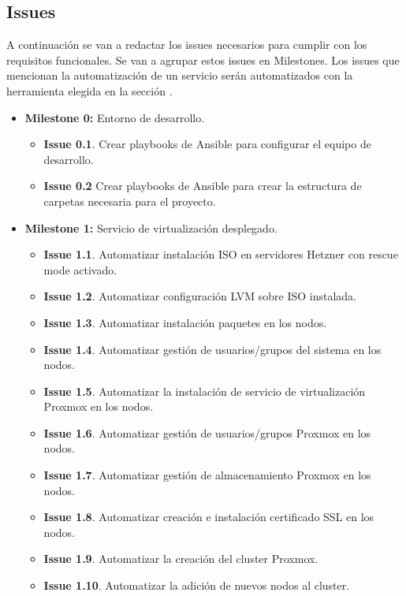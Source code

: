 \subsection{Issues}
\label{issues}
\begin{text}
	A continuación se van a redactar los issues necesarios para cumplir con los requisitos funcionales. Se van a agrupar estos issues en Milestones. Los issues que mencionan la automatización de un servicio serán automatizados con la herramienta elegida en la sección .
	
	\begin{itemize}
		\item \textbf{Milestone 0:} Entorno de desarrollo. 
		\begin{itemize}
			\item \textbf{Issue 0.1}. Crear playbooks de Ansible para configurar el equipo de desarrollo.
			\item \textbf{Issue 0.2} Crear playbooks de Ansible para crear la estructura de carpetas necesaria para el proyecto.
		\end{itemize}
		\item \textbf{Milestone 1:} Servicio de virtualización desplegado. 
		\begin{itemize}
			\item \textbf{Issue 1.1}. Automatizar instalación ISO en servidores Hetzner con rescue mode activado.
			\item \textbf{Issue 1.2}. Automatizar configuración LVM sobre ISO instalada.
			\item \textbf{Issue 1.3}. Automatizar instalación paquetes en los nodos.
			\item \textbf{Issue 1.4}. Automatizar gestión de usuarios/grupos del sistema en los nodos.
			\item \textbf{Issue 1.5}. Automatizar la instalación de servicio de virtualización Proxmox en los nodos.
			\item \textbf{Issue 1.6}. Automatizar gestión de usuarios/grupos Proxmox en los nodos.
			\item \textbf{Issue 1.7}. Automatizar gestión de almacenamiento Proxmox en los nodos.
			\item \textbf{Issue 1.8}. Automatizar creación e instalación certificado SSL en los nodos.
			\item \textbf{Issue 1.9}. Automatizar la creación del cluster Proxmox.
			\item \textbf{Issue 1.10}. Automatizar la adición de nuevos nodos al cluster.

\end{itemize}
\end{itemize}
\end{text}

